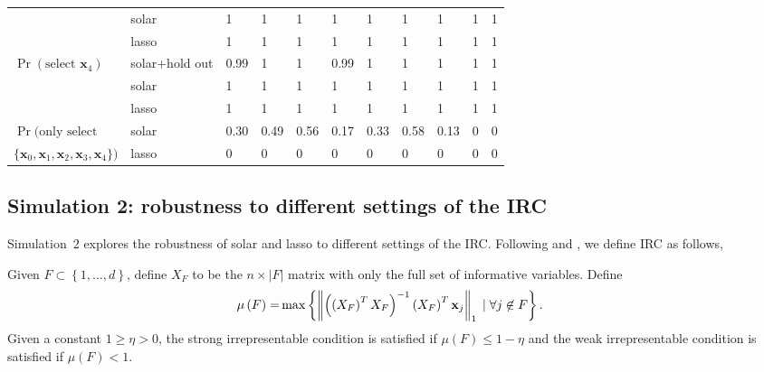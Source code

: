 \documentclass[12pt]{article}
\begin{document}
\begin{table}[h]
\begin{tabular}{lllllllllll}
    & solar          & 1 & 1 & 1 & 1 & 1 & 1 & 1 & 1 & 1 \\
    & lasso          & 1 & 1 & 1 & 1 & 1 & 1 & 1 & 1 & 1 \\
    $\Pr(\mbox{select }\mathbf{x}_4)$
    & solar+hold out & 0.99 & 1 & 1 & 0.99 & 1 & 1 & 1 & 1 & 1 \\
    & solar          & 1 & 1 & 1 & 1 & 1 & 1 & 1 & 1 & 1 \\
    & lasso          & 1 & 1 & 1 & 1 & 1 & 1 & 1 & 1 & 1 \\
    $\Pr(\mbox{only select }$ & solar & 0.30 & 0.49 & 0.56 & 0.17 & 0.33 & 0.58 & 0.13 & 0 & 0 \\
    $\{\mathbf{x}_0,\mathbf{x}_1,\mathbf{x}_2,\mathbf{x}_3,\mathbf{x}_4\})$
    & lasso & 0    & 0    & 0    & 0    & 0    & 0    & 0    & 0    & 0    \\
    \bottomrule
  \end{tabular}
\end{table}


\subsection{Simulation 2: robustness to different settings of the IRC \label{subsection:simul_2}}

Simulation~2 explores the robustness of solar and lasso to different settings of the IRC. Following \citet{tropp2004greed} and \citet{wainwright2009sharp}, we define IRC as follows,

\begin{definition}[IRC]
Given $F \subset \left\{ 1, \ldots, d \right\}$, define $X_F$ to be the $n \times \left\vert F \right \vert$ matrix with only the full set of informative variables. Define
%
\begin{align}
%
\mu \left( F \right) = & \max \left\{ \left\Vert \left( \left( X_F \right)^T X_F \right)^{-1} \left( X_F \right)^T \mathbf{x}_j \right\Vert_1 \; \vert \; \forall j \not\in F \right\}. \notag
%
\end{align}
%
Given a constant $1 \geqslant \eta > 0$, the strong irrepresentable condition is satisfied if $\mu \left( F \right) \leqslant 1 - \eta$ and the weak irrepresentable condition is satisfied if $\mu \left( F \right) < 1$.
\end{definition}
\end{document}
